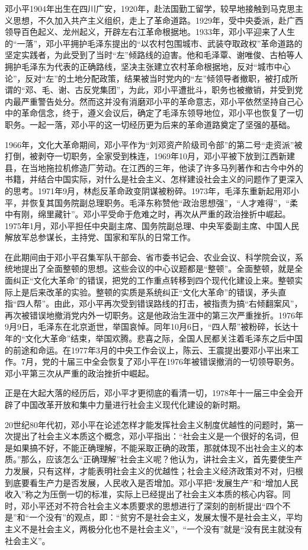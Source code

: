\documentclass[cs4size,a4paper,nofonts]{ctexart}
\begin{document}
邓小平1904年出生在四川广安，1920年，赴法国勤工留学，较早地接触到马克思主义思想，不久加入共产主义组织，走上了革命道路。1929年，受中央委派，赴广西领导百色起义、龙州起义，开辟左右江革命根据地。1933年，邓小平迎来了人生的“一落”，邓小平拥护毛泽东提出的“以农村包围城市、武装夺取政权”革命道路的坚定实践者，为此受到了当时“左”倾路线的迫害。他和毛泽覃、谢唯俊、古柏等人拥护毛泽东为代表的正确路线，坚决主张建立农村革命根据地，反对“城市中心论”，反对“左”的土地分配政策，结果被当时党内的“左”倾领导者撤职，被打成所谓的“邓、毛、谢、古反党集团”，为此，邓小平遭批斗，职务也被撤销，并受到党内最严重警告处分。然而这并没有消磨邓小平的革命意志，邓小平依然坚持自己心中的革命信念，终于，遵义会议后，确定了毛泽东领导地位，邓小平也恢复了一切职务。一起一落，邓小平的这一切经历更为后来的革命道路奠定了坚强的基础。
  
1966年，文化大革命期间，邓小平作为“刘邓资产阶级司令部”的第二号“走资派”被打倒，被剥夺一切职务，全家受到株连，1969年10月，邓小平被下放到江西新建县，在当地拖拉机修造厂劳动。在江西的三年，他读了许多马列著作和古今中外的书籍，并结合中国实际，对什么是社会主义、怎样建设社会主义的问题作了更深入的思考。1971年9月，林彪反革命政变阴谋被粉碎。1973年，毛泽东重新起用邓小平，并恢复其国务院副总理职务。毛泽东称赞他“政治思想强”，“人才难得”，“柔中有刚，绵里藏针”。邓小平受命于危难之时，再次从严重的政治挫折中崛起。1975年1月，邓小平担任中央副主席、国务院副总理、中央军委副主席、中国人民解放军总参谋长，主持党、国家和军队的日常工作。

在此期间由于邓小平召集军队干部会、省市委书记会、农业会议、科学院会议，系统地提出了全面整顿的思想。这些会议的中心议题都是“整顿”。全面整顿，就是全面纠正“文化大革命”的错误，把党的工作重点转移到四个现代化建设上来。整顿实际上是后来改革的实验。整顿的实质是系统纠正“文化大革命”的错误，矛头直指“四人帮”。由此，邓小平再次受到错误路线的打击，被指责为搞“右倾翻案风”，再次被错误地撤消党内外一切职务。这是他政治生涯中的第三次严重挫折。1976年9月9日，毛泽东在北京逝世，举国哀悼。同年10月6日，“四人帮”被粉碎，长达十年的“文化大革命”结束，举国欢腾。悲喜之际，全国人民都关注着毛泽东之后中国的前途和命运。在1977年3月的中央工作会议上，陈云、王震提出要邓小平出来工作。7月，党的十届三中全会恢复了邓小平在1976年被错误撤消的一切领导职务。邓小平第三次从严重的政治挫折中崛起。

正是在大起大落的经历后，邓小平才更彻底的看清一切，1978年十一届三中全会开辟了中国改革开放和集中力量进行社会主义现代化建设的新时期。

20世纪80年代初，邓小平在论述怎样才能发挥社会主义制度优越性的问题时，第一次提出了社会主义本质这个概念，邓小平指出：“社会主义是一个很好的名词，但是如果搞不好，不能正确理解，不能采取正确的政策，那就体现不出社会主义的本质。”那么，应该怎么“正确理解”社会主义呢？他认为，讲社会主义，首先要使生产力发展，只有这样，才能表明社会主义的优越性；社会主义经济政策对不对，归根到底要看生产力是否发展，人民收入是否增加。邓小平把“发展生产”和“增加人民收入”称之为压倒一切的标准，实际上已经提出了社会主义本质的核心内容。同时，邓小平还对不符合社会主义本质要求的思想进行了深刻的剖析提出“四个不是”和“一个没有”的观点，即：“贫穷不是社会主义，发展太慢不是社会主义，平均主义不是社会主义，两极分化也不是社会主义”，“一个没有”就是“没有民主就没有社会主义”。
\end{document}
